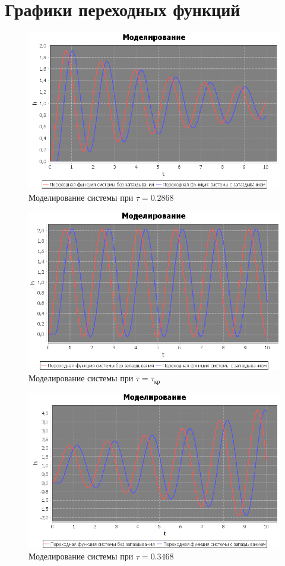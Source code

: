 \documentclass[12pt]{article}
\begin{document}
\section{Графики переходных функций}
\begin{figure}[h!]
     \centering
    \includegraphics[width = \linewidth]{моделирование 1.png}
    \caption{Моделирование системы при $\tau = 0.2868$}
\end{figure}
\begin{figure}[h!]
     \centering
    \includegraphics[width = \linewidth]{моделирование 2.png}
    \caption{Моделирование системы при $\tau = \tau_{кр}$}
\end{figure} 
\newpage
\begin{figure}[h!]
     \centering
    \includegraphics[width = \linewidth]{моделирование 3.png}
    \caption{Моделирование системы при $\tau = 0.3468$}
\end{figure} 
\end{document}

